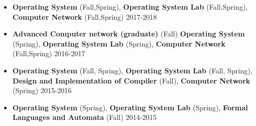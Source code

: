 \documentclass[a4paper,10pt]{article} %
\begin{document}
\begin{itemize}
	\item	
		\textbf{Operating System} (Fall,Spring), 
		\textbf{Operating System Lab} (Fall,Spring), 
		\textbf{Computer Network} (Fall,Spring)
		\hfill {2017-2018}\\	
	
	\item	
		\textbf{Advanced Computer network (graduate)} (Fall) 
		\textbf{Operating System} (Spring), 
		\textbf{Operating System Lab} (Spring), 
		\textbf{Computer Network} (Fall,Spring)
		\hfill {2016-2017}\\
	
	\item	
		\textbf {Operating System} (Fall, Spring), 
		\textbf {Operating System Lab} (Fall, Spring),	
		\textbf {Design and Implementation of Compiler} (Fall),
		\textbf {Computer Network} (Spring)
		\hfill {2015-2016}\\

	\item	
		\textbf {Operating System} (Spring), 
		\textbf {Operating System Lab} (Spring),	
		\textbf {Formal Languages and Automata} (Fall)
		\hfill {2014-2015}\\
	
	
\end{itemize}
\end{document}

